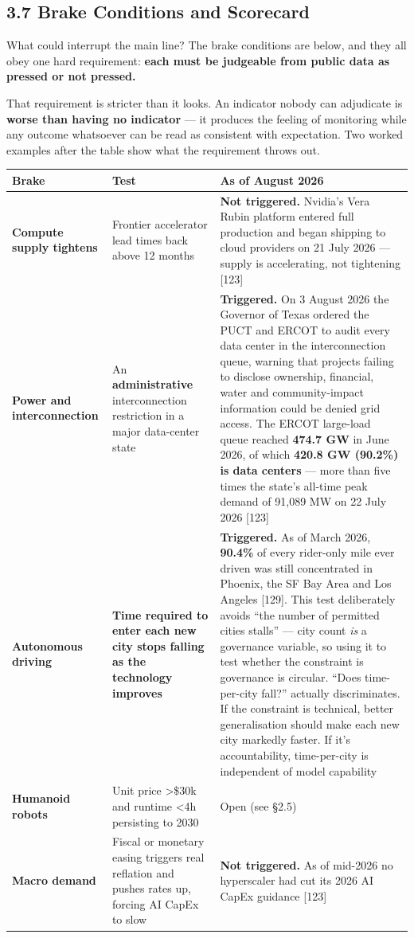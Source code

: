 \documentclass[11pt,a4paper]{article}
\begin{document}
\subsection{3.7 Brake Conditions and Scorecard}

What could interrupt the main line? The brake conditions are below, and they all obey one hard requirement: \textbf{each must be judgeable from public data as pressed or not pressed.}

That requirement is stricter than it looks. An indicator nobody can adjudicate is \textbf{worse than having no indicator} --- it produces the feeling of monitoring while any outcome whatsoever can be read as consistent with expectation. Two worked examples after the table show what the requirement throws out.

\begin{center}

\begin{tabularx}{\textwidth}{lXX}
\toprule
Brake & Test & As of August 2026 \\
\midrule
\textbf{Compute supply tightens} & Frontier accelerator lead times back above 12 months & \textbf{Not triggered.} Nvidia's Vera Rubin platform entered full production and began shipping to cloud providers on 21 July 2026 --- supply is accelerating, not tightening [123] \\
\textbf{Power and interconnection} & An \textbf{administrative} interconnection restriction in a major data-center state & \textbf{Triggered.} On 3 August 2026 the Governor of Texas ordered the PUCT and ERCOT to audit every data center in the interconnection queue, warning that projects failing to disclose ownership, financial, water and community-impact information could be denied grid access. The ERCOT large-load queue reached \textbf{474.7 GW} in June 2026, of which \textbf{420.8 GW (90.2\%) is data centers} --- more than five times the state's all-time peak demand of 91,089 MW on 22 July 2026 [123] \\
\textbf{Autonomous driving} & \textbf{Time required to enter each new city stops falling as the technology improves} & \textbf{Triggered.} As of March 2026, \textbf{90.4\%} of every rider-only mile ever driven was still concentrated in Phoenix, the SF Bay Area and Los Angeles [129]. This test deliberately avoids ``the number of permitted cities stalls'' --- city count \textit{is} a governance variable, so using it to test whether the constraint is governance is circular. ``Does time-per-city fall?'' actually discriminates. If the constraint is technical, better generalisation should make each new city markedly faster. If it's accountability, time-per-city is independent of model capability \\
\textbf{Humanoid robots} & Unit price >\$30k and runtime <4h persisting to 2030 & Open (see \S{}2.5) \\
\textbf{Macro demand} & Fiscal or monetary easing triggers real reflation and pushes rates up, forcing AI CapEx to slow & \textbf{Not triggered.} As of mid-2026 no hyperscaler had cut its 2026 AI CapEx guidance [123] \\
\bottomrule
\end{tabularx}
\end{center}
\end{document}
